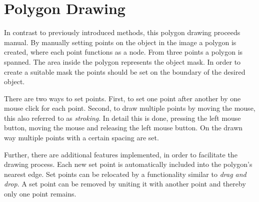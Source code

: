 
\section{Polygon Drawing}\label{ord:ch3:sec1}

In contrast to previously introduced methods, this polygon drawing proceeds manual.
By manually setting points on the object in the image a polygon is created, where each point functions as a node.
From three points a polygon is spanned.
The area inside the polygon represents the object mask.
In order to create a suitable mask the points should be set on the boundary of the desired object.

There are two ways to set points.
First, to set one point after another by one mouse click for each point.
Second, to draw multiple points by moving the mouse, this also referred to as \textit{stroking}.
In detail this is done, pressing the left mouse button, moving the mouse and releasing the left mouse button.
On the drawn way multiple points with a certain spacing are set.

Further, there are additional features implemented, in order to facilitate the drawing process.
Each new set point is automatically included into the polygon's nearest edge.
Set points can be relocated by a functionality similar to \textit{drag and drop}.
A set point can be removed by uniting it with another point and thereby only one point remains.

